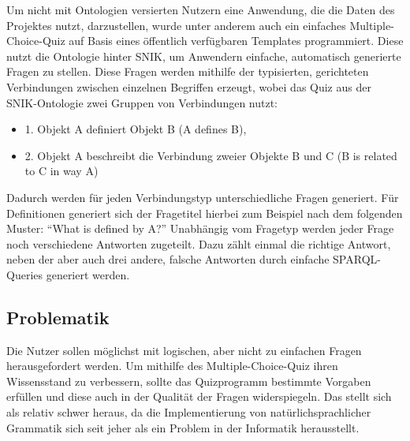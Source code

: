 \documentclass[headsepline,titlepage,ngerman,twoside,12pt]{report}
\newcommand\todo[1]{}%
\begin{document}
Um nicht mit Ontologien versierten Nutzern eine Anwendung, die die Daten des Projektes nutzt, darzustellen, wurde unter anderem auch ein einfaches Multiple-Choice-Quiz auf Basis eines öffentlich verfügbaren Templates programmiert.
Diese nutzt die Ontologie hinter SNIK, um Anwendern einfache, automatisch generierte Fragen zu stellen.
Diese Fragen werden mithilfe der typisierten, gerichteten Verbindungen zwischen einzelnen Begriffen erzeugt, wobei das Quiz aus der SNIK-Ontologie zwei Gruppen von Verbindungen nutzt:
\begin{itemize}
    \item 1. Objekt A definiert Objekt B (A defines B),
    \item 2. Objekt A beschreibt die Verbindung zweier Objekte B und C (B is related to C in way A)
\end{itemize}
Dadurch werden für jeden Verbindungstyp unterschiedliche Fragen generiert.
Für Definitionen generiert sich der Fragetitel hierbei zum Beispiel nach dem folgenden Muster:
\newline \enquote{What is defined by A?}\newline
Unabhängig vom Fragetyp werden jeder Frage noch verschiedene Antworten zugeteilt.
Dazu zählt einmal die richtige Antwort, neben der aber auch drei andere, falsche Antworten durch einfache SPARQL-Queries generiert werden. 

\todo{
\begin{itemize}
\item In welcher Welt/Domäne oder welchem Arbeitsbereich/-gebiet bewegen wir uns im Rahmen der Seminararbeit/der ausgewählten Papers?
\item Worum geht es eigentlich?
\end{itemize}
Aus den Papers bzw. dem Antrag des Forschungsprojektes entnehmen.
}

\subsection{Problematik}
\label{sub:Problematik}
\todo{generell im gesamten text: jeden satz auf eine zeile}
Die Nutzer sollen möglichst mit logischen, aber nicht zu einfachen Fragen herausgefordert werden.
Um mithilfe des Multiple-Choice-Quiz ihren Wissensstand zu verbessern, sollte das Quizprogramm bestimmte Vorgaben erfüllen und diese auch in der Qualität der Fragen widerspiegeln.
Das stellt sich als relativ schwer heraus, da die Implementierung von natürlichsprachlicher Grammatik sich seit jeher als ein Problem in der Informatik herausstellt.
\end{document}

